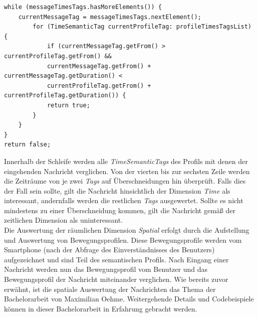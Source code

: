 \begin{lstlisting}
while (messageTimesTags.hasMoreElements()) {
	currentMessageTag = messageTimesTags.nextElement();
		for (TimeSemanticTag currentProfileTag: profileTimesTagsList) {
			if (currentMessageTag.getFrom() > currentProfileTag.getFrom() &&
			currentMessageTag.getFrom() + currentMessageTag.getDuration() <
			currentProfileTag.getFrom() + currentProfileTag.getDuration()) {
			return true;
		}
	}
}
return false;
\end{lstlisting}
Innerhalb der Schleife werden alle \textit{TimeSemanticTags} des Profils mit denen der eingehenden Nachricht verglichen. Von der vierten bis zur sechsten Zeile werden die Zeiträume von je zwei \textit{Tags} auf Überschneidungen hin überprüft. Falls dies der Fall sein sollte, gilt die Nachricht hinsichtlich der Dimension \textit{Time} als interessant, andernfalls werden die restlichen \textit{Tags} ausgewertet. Sollte es nicht mindestens zu einer Überschneidung kommen, gilt die Nachricht gemäß der zeitlichen Dimension als uninteressant.
\\Die Auswertung der räumlichen Dimension \textit{Spatial} erfolgt durch die Aufstellung und Auswertung von Bewegungsprofilen. Diese Bewegungsprofile werden vom Smartphone (nach der Abfrage des Einverständnisses des Benutzers) aufgezeichnet und sind Teil des semantischen Profils. Nach Eingang einer Nachricht werden nun das Bewegungsprofil vom Benutzer und das Bewegungsprofil der Nachricht miteinander verglichen. Wie bereits zuvor erwähnt, ist die spatiale Auswertung der Nachrichten das Thema der Bachelorarbeit von Maximilian Oehme. Weitergehende Details und Codebeispiele können in dieser Bachelorarbeit in Erfahrung gebracht werden.

